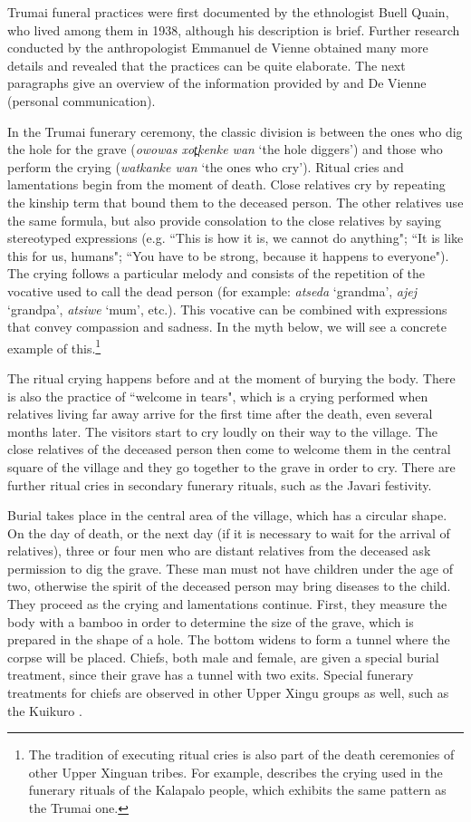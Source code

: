 \documentclass[output=paper,
modfonts,nonflat
]{langsci/langscibook}
\begin{document}
Trumai funeral practices were first documented by the ethnologist Buell Quain, who lived among them in 1938, although his description is brief. Further research conducted by the anthropologist Emmanuel de Vienne obtained many more details and revealed that the practices can be quite elaborate. The next paragraphs give an overview of the information provided by \citet{MurphyQuain1955} and De Vienne (personal communication).

In the Trumai funerary ceremony, the classic division is between the ones who dig the hole for the grave (\textit{owowas xot̪kenke wan} ‘the hole diggers') and those who perform the crying (\textit{watkanke wan} ‘the ones who cry'). Ritual cries and lamentations begin from the moment of death. Close relatives cry by repeating the kinship term that bound them to the deceased person. The other relatives use the same formula, but also provide consolation to the close relatives by saying stereotyped expressions (e.g. “This is how it is, we cannot do anything"; “It is like this for us, humans"; “You have to be strong, because it happens to everyone"). The crying follows a particular melody and consists of the repetition of the vocative used to call the dead person (for example: \textit{atseda} ‘grandma', \textit{ajej} ‘grandpa', \textit{atsiwe} ‘mum', etc.). This vocative can be combined with expressions that convey compassion and sadness. In the myth below, we will see a concrete example of this.\footnote{The tradition of executing ritual cries is also part of the death ceremonies of other Upper Xinguan tribes. For example, \citet[441]{GuerreiroJúnior2012} describes the crying used in the funerary rituals of the Kalapalo people, which exhibits the same pattern as the Trumai one.}

The ritual crying happens before and at the moment of burying the body. There is also the practice of “welcome in tears", which is a crying performed when relatives living far away arrive for the first time after the death, even several months later. The visitors start to cry loudly on their way to the village. The close relatives of the deceased person then come to welcome them in the central square of the village and they go together to the grave in order to cry. There are further ritual cries in secondary funerary rituals, such as the Javari festivity.

Burial takes place in the central area of the village, which has a circular shape. On the day of death, or the next day (if it is necessary to wait for the arrival of relatives), three or four men who are distant relatives from the deceased ask permission to dig the grave. These man must not have children under the age of two, otherwise the spirit of the deceased person may bring diseases to the child. They proceed as the crying and lamentations continue. First, they measure the body with a bamboo in order to determine the size of the grave, which is prepared in the shape of a hole. The bottom widens to form a tunnel where the corpse will be placed. Chiefs, both male and female, are given a special burial treatment, since their grave has a tunnel with two exits. Special funerary treatments for chiefs are observed in other Upper Xingu groups as well, such as the Kuikuro \citep{Heckenberger2003}. 
\end{document}
